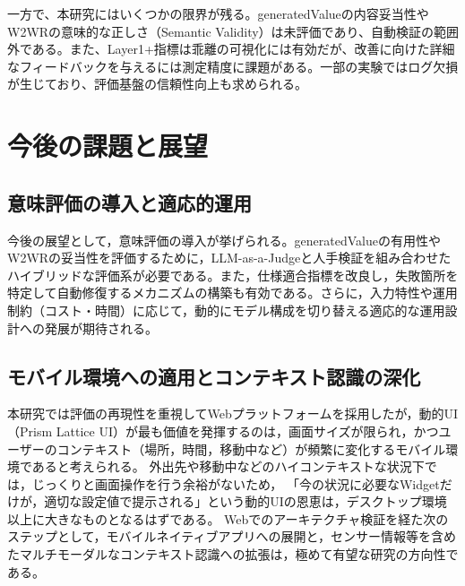 \documentclass[senior,final,11pt,dvipdfmx]{iputit-thesis}
\begin{document}
一方で、本研究にはいくつかの限界が残る。generatedValueの内容妥当性やW2WRの意味的な正しさ（Semantic Validity）は未評価であり、自動検証の範囲外である。また、Layer1+指標は乖離の可視化には有効だが、改善に向けた詳細なフィードバックを与えるには測定精度に課題がある。一部の実験ではログ欠損が生じており、評価基盤の信頼性向上も求められる。

\section{今後の課題と展望}
\label{sec:conc_future}

\subsection{意味評価の導入と適応的運用}

今後の展望として，意味評価の導入が挙げられる。generatedValueの有用性やW2WRの妥当性を評価するために，LLM-as-a-Judgeと人手検証を組み合わせたハイブリッドな評価系が必要である。また，仕様適合指標を改良し，失敗箇所を特定して自動修復するメカニズムの構築も有効である。さらに，入力特性や運用制約（コスト・時間）に応じて，動的にモデル構成を切り替える適応的な運用設計への発展が期待される。

\subsection{モバイル環境への適用とコンテキスト認識の深化}

本研究では評価の再現性を重視してWebプラットフォームを採用したが，動的UI（Prism Lattice UI）が最も価値を発揮するのは，画面サイズが限られ，かつユーザーのコンテキスト（場所，時間，移動中など）が頻繁に変化するモバイル環境であると考えられる。
外出先や移動中などのハイコンテキストな状況下では，じっくりと画面操作を行う余裕がないため，
「今の状況に必要なWidgetだけが，適切な設定値で提示される」という動的UIの恩恵は，デスクトップ環境以上に大きなものとなるはずである。
Webでのアーキテクチャ検証を経た次のステップとして，モバイルネイティブアプリへの展開と，センサー情報等を含めたマルチモーダルなコンテキスト認識への拡張は，極めて有望な研究の方向性である。


\newcommand{\DynUILevel}{Level} %
\newcommand{\LevelFour}{Level4} %
\newcommand{\LLMStep}{Step} %


\end{document}
